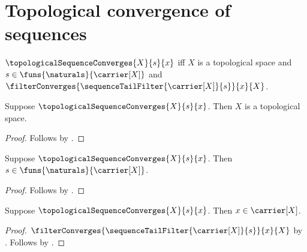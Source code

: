 \section{Topological convergence of sequences}




\begin{definition}\label{topological_sequence_convergence}
    $\topologicalSequenceConverges{X}{s}{x}$ iff
        $X$ is a topological space and
        $s\in\funs{\naturals}{\carrier[X]}$ and
        $\filterConverges{\sequenceTailFilter{\carrier[X]}{s}}{x}{X}$.
\end{definition}

\begin{proposition}\label{topological_sequence_convergence_space}
    Suppose $\topologicalSequenceConverges{X}{s}{x}$.
    Then $X$ is a topological space.
\end{proposition}
\begin{proof}
    Follows by .
\end{proof}

\begin{proposition}\label{topological_sequence_convergence_sequence}
    Suppose $\topologicalSequenceConverges{X}{s}{x}$.
    Then $s\in\funs{\naturals}{\carrier[X]}$.
\end{proposition}
\begin{proof}
    Follows by .
\end{proof}

\begin{proposition}\label{topological_sequence_convergence_point}
    Suppose $\topologicalSequenceConverges{X}{s}{x}$.
    Then $x\in\carrier[X]$.
\end{proposition}
\begin{proof}
    $\filterConverges{\sequenceTailFilter{\carrier[X]}{s}}{x}{X}$
        by .
    Follows by .
\end{proof}

